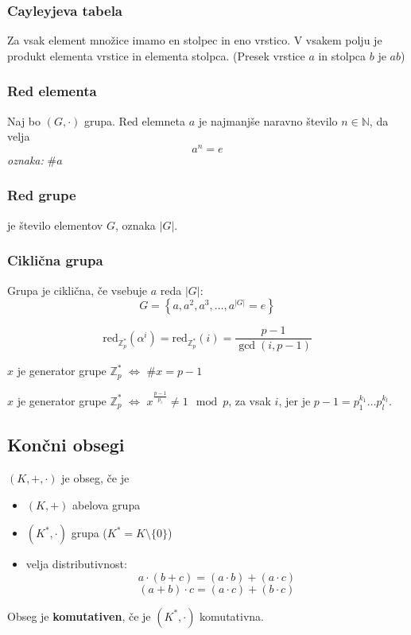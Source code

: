\begin{multicols}{5}
\subsubsection{Cayleyjeva tabela}
Za vsak element množice imamo en stolpec in eno vrstico. V vsakem polju je produkt elementa vrstice in elementa stolpca.
(Presek vrstice $a$ in stolpca $b$ je $ab$)

\subsubsection{Red elementa}
Naj bo $(G,\cdot)$ grupa. Red elemneta $a$ je najmanjše naravno število $n \in \mathbb{N}$, da velja
\[a^n = e\]
\textit{oznaka:} $\#a$

\subsubsection{Red grupe}
je število elementov $G$, oznaka $|G|$.

\subsubsection*{Ciklična grupa}
Grupa je ciklična, če vsebuje $a$ reda $|G|$:
\[ G = \left\{ a, a^2, a^3, \dots, a^{|G|} = e\right\}\]


\[ \text{red}_{\mathbb{Z}_p^*}(\alpha^i) = \text{red}_{\mathbb{Z}_p^*}(i) = \frac{p-1}{\gcd(i, p-1)}\]

$x$ je generator grupe $\mathbb{Z}^*_p$ $\iff$ $\# x = p - 1$

$x$ je generator grupe $\mathbb{Z}^*_p$ $\iff$ $x^{\frac{p-1}{p_i}} \neq 1 \mod p$, za vsak $i$, jer je $p-1 = p_1^{k_1} \dots p_l^{k_l}$.

\subsection*{Končni obsegi}
$(K, +,\cdot)$ je obseg, če je
\begin{itemize}
	\item $(K, +)$ abelova grupa
	\item $(K^*, \cdot)$ grupa ($K^* = K \setminus \{0\}$)
	\item velja distributivnost:
	\[ a \cdot (b+c) = (a\cdot b) + (a \cdot c)\]
	\[ (a+b) \cdot c = (a\cdot c) + (b \cdot c)\]
\end{itemize}

Obseg je \textbf{komutativen}, če je $(K^*, \cdot)$ komutativna.


\end{multicols}

